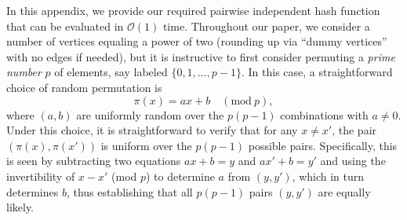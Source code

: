 \documentclass[journal]{IEEEtran}
\theoremstyle{definition}
\theoremstyle{definition}
\newcommand{\bigO}{\mathcal{O}}
\begin{document}


In this appendix, we provide our required pairwise independent hash function that can be evaluated in $\bigO(1)$ time.  Throughout our paper, we consider a number of vertices equaling a power of two (rounding up via ``dummy vertices'' with no edges if needed), but it is instructive to first consider permuting a \emph{prime number} $p$ of elements, say labeled $\{0,1,\dotsc,p-1\}$.  In this case, a straightforward choice of random permutation is
\begin{equation*}
    \pi(x) = ax + b \quad (\mathrm{mod}~p),
\end{equation*}
where $(a,b)$ are uniformly random over the $p(p-1)$ combinations with $a \ne 0$.  Under this choice, it is straightforward to verify that for any $x\ne x'$, the pair $(\pi(x),\pi(x'))$ is uniform over the $p(p-1)$ possible pairs.  Specifically, this is seen by subtracting two equations $ax+b=y$ and $ax'+b=y'$ and using the invertibility of $x-x'$ (mod $p$) to determine $a$ from $(y,y')$, which in turn determines $b$, thus establishing that all $p(p-1)$ pairs $(y,y')$ are equally likely.
\end{document}
